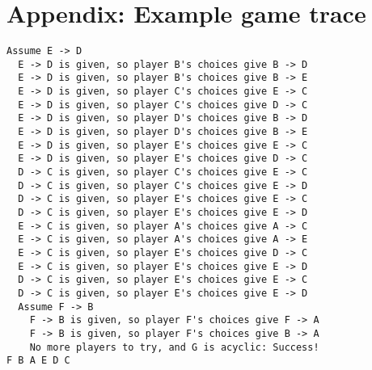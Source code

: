 \documentclass[12pt,x11names, rgb]{article}
\begin{document}
\section{Appendix: Example game trace}
\label{app:example_output}
\begin{verbatim}
Assume E -> D
  E -> D is given, so player B's choices give B -> D
  E -> D is given, so player B's choices give B -> E
  E -> D is given, so player C's choices give E -> C
  E -> D is given, so player C's choices give D -> C
  E -> D is given, so player D's choices give B -> D
  E -> D is given, so player D's choices give B -> E
  E -> D is given, so player E's choices give E -> C
  E -> D is given, so player E's choices give D -> C
  D -> C is given, so player C's choices give E -> C
  D -> C is given, so player C's choices give E -> D
  D -> C is given, so player E's choices give E -> C
  D -> C is given, so player E's choices give E -> D
  E -> C is given, so player A's choices give A -> C
  E -> C is given, so player A's choices give A -> E
  E -> C is given, so player E's choices give D -> C
  E -> C is given, so player E's choices give E -> D
  D -> C is given, so player E's choices give E -> C
  D -> C is given, so player E's choices give E -> D
  Assume F -> B
    F -> B is given, so player F's choices give F -> A
    F -> B is given, so player F's choices give B -> A
    No more players to try, and G is acyclic: Success!
F B A E D C
\end{verbatim}
\end{document}
